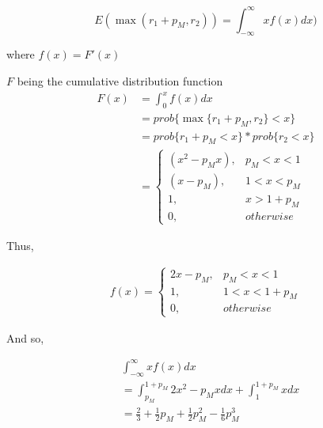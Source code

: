 \documentclass{article}
\begin{document}
\[E(\max (r_1 + p_M , r_2)) = \int^\infty_{-\infty} xf(x) dx ) \]

where \( f(x) = F'(x)\)

\(F\) being the cumulative distribution function
\begin{align}
F(x) &= \int^x_0 f(x) dx \\
&= prob \{ \max \{r_1 + p_M , r_2 \} < x \} \\
&= prob \{ r_1 + p_M < x \} * prob \{ r_2 < x\} \\
&=
	\begin{cases}
		( x^2 - p_Mx), &p_M < x < 1 \\
		( x - p_M ), &1 < x < p_M \\
		1, & x > 1 + p_M \\
		0, &otherwise
	\end{cases}
\end{align}

Thus,

\begin{align}
f(x) = 
	\begin{cases}
		2x - p_M, & p_M < x < 1 \\
		1, & 1 < x < 1 + p_M \\
		0, & otherwise
	\end{cases}
\end{align}

And so,

\begin{align}
&\int^\infty_{-\infty} xf(x) dx \\
	&= \int^{1+p_M}_{p_M} 2x^2 - p_Mx dx + \int^{1+p_M}_1 x dx\\
	&= \frac{2}{3} + \frac{1}{2} p_M + \frac{1}{2}  p_M^2 - \frac{1}{6} p_M^3
\end{align}
\end{document}

